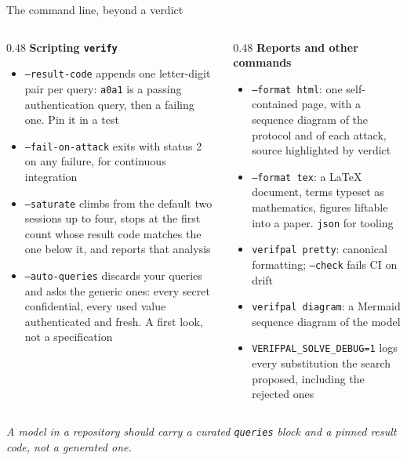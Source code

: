 \ifdefined\PRESENTATION\else\PassOptionsToClass{handout}{beamer}\fi\documentclass[aspectratio=169, lualatex]{beamer}
\begin{document}
\begin{frame}{The command line, beyond a verdict}
	\scriptsize
	\begin{columns}[t]
		\begin{column}{0.48\textwidth}
			\textbf{Scripting \texttt{verify}}
			\begin{itemize}
				\item \texttt{--result-code} appends one letter-digit pair per query: \texttt{a0a1} is a passing authentication query, then a failing one. Pin it in a test
				\item \texttt{--fail-on-attack} exits with status 2 on any failure, for continuous integration
				\item \texttt{--saturate} climbs from the default two sessions up to four, stops at the first count whose result code matches the one below it, and reports that analysis
				\item \texttt{--auto-queries} discards your queries and asks the generic ones: every secret confidential, every used value authenticated and fresh. A first look, not a specification
			\end{itemize}
		\end{column}
		\begin{column}{0.48\textwidth}
			\textbf{Reports and other commands}
			\begin{itemize}
				\item \texttt{--format html}: one self-contained page, with a sequence diagram of the protocol and of each attack, source highlighted by verdict
				\item \texttt{--format tex}: a LaTeX document, terms typeset as mathematics, figures liftable into a paper. \texttt{json} for tooling
				\item \texttt{verifpal pretty}: canonical formatting; \texttt{--check} fails CI on drift
				\item \texttt{verifpal diagram}: a Mermaid sequence diagram of the model
				\item \texttt{VERIFPAL\_SOLVE\_DEBUG=1} logs every substitution the search proposed, including the rejected ones
			\end{itemize}
		\end{column}
	\end{columns}
	\vspace{0.4em}
	\begin{center}
		\small \textit{A model in a repository should carry a curated \texttt{queries} block and a pinned result code, not a generated one.}
	\end{center}
\end{frame}
\end{document}

